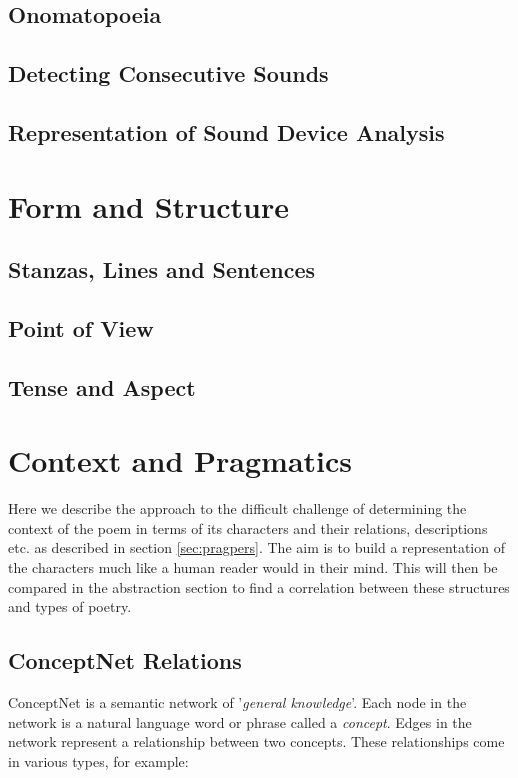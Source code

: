 \subsection{Onomatopoeia}

\subsection{Detecting Consecutive Sounds}

\subsection{Representation of Sound Device Analysis}



\section{Form and Structure}

\subsection{Stanzas, Lines and Sentences}

\subsection{Point of View}

\subsection{Tense and Aspect}



\section{Context and Pragmatics}
Here we describe the approach to the difficult challenge of determining the context of the poem in terms of its characters and their relations, descriptions etc. as described in section \ref{sec:pragpers}. The aim is to build a representation of the characters much like a human reader would in their mind. This will then be compared in the abstraction section to find a correlation between these structures and types of poetry.

\subsection{ConceptNet Relations}
ConceptNet is a semantic network of '\textit{general knowledge}'. Each node in the network is a natural language word or phrase called a \textit{concept}. Edges in the network represent a relationship between two concepts. These relationships come in various types, for example:

